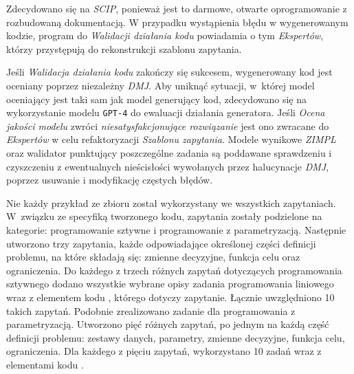  Zdecydowano się na \textit{SCIP}, ponieważ jest to darmowe, otwarte oprogramowanie z rozbudowaną dokumentacją. %
 W przypadku wystąpienia błędu w wygenerowanym kodzie, program do \textit{Walidacji działania kodu} powiadamia o tym \textit{Ekspertów}, którzy przystępują do rekonstrukcji szablonu zapytania.

Jeśli \textit{Walidacja działania kodu} zakończy się sukcesem, wygenerowany kod jest oceniany poprzez niezależny \textit{DMJ}. Aby uniknąć sytuacji, w~której model oceniający jest taki sam jak model generujący kod, zdecydowano się na wykorzystanie modelu \texttt{GPT-4} do ewaluacji działania generatora. Jeśli \textit{Ocena jakości modelu} zwróci \textit{niesatysfakcjonujące rozwiązanie} jest ono zwracane do \textit{Ekspertów} w celu refaktoryzacji \textit{Szablonu zapytania}. Modele wynikowe \textit{ZIMPL} oraz walidator punktujący poszczególne zadania są poddawane sprawdzeniu i czyszczeniu z ewentualnych nieścisłości wywołanych przez halucynacje \textit{DMJ}, poprzez usuwanie i modyfikację częstych błędów.



Nie każdy przykład ze zbioru został wykorzystany we wszystkich zapytaniach. W~związku ze specyfiką tworzonego kodu, zapytania zostały podzielone na kategorie: programowanie sztywne i programowanie z parametryzacją. Następnie utworzono trzy zapytania, każde odpowiadające określonej części definicji problemu, na które składają się: zmienne decyzyjne, funkcja celu oraz ograniczenia. Do każdego z trzech różnych zapytań dotyczących programowania sztywnego %
dodano wszystkie wybrane opisy zadania programowania liniowego
wraz z elementem kodu  , którego dotyczy zapytanie. Łącznie uwzględniono 10 takich zapytań. Podobnie zrealizowano zadanie dla programowania z parametryzacją. Utworzono pięć różnych zapytań, po jednym na każdą część definicji problemu: zestawy danych, parametry, zmienne decyzyjne, funkcja celu, ograniczenia. Dla każdego z pięciu zapytań, wykorzystano 10 zadań wraz z elementami kodu  . %


